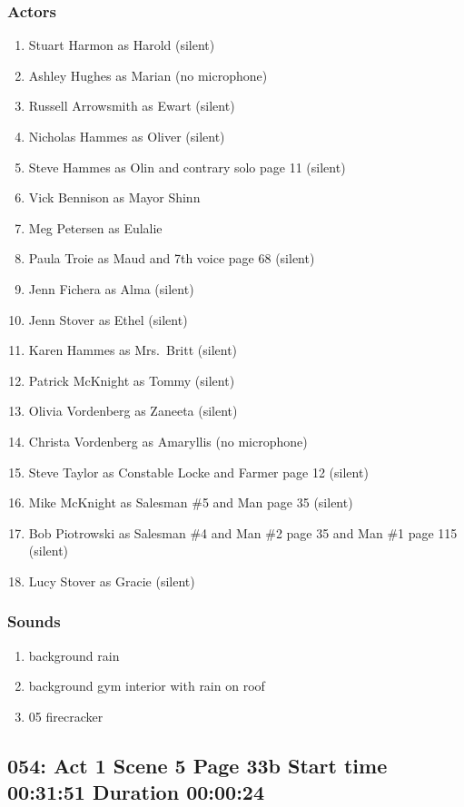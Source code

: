 \subsubsection{Actors}
\begin{enumerate}
\item Stuart Harmon as Harold (silent)
\item Ashley Hughes as Marian (no microphone)
\item Russell Arrowsmith as Ewart (silent)
\item Nicholas Hammes as Oliver (silent)
\item Steve Hammes as Olin and contrary solo page 11 (silent)
\item Vick Bennison as Mayor Shinn
\item Meg Petersen as Eulalie
\item Paula Troie as Maud and 7th voice page 68 (silent)
\item Jenn Fichera as Alma (silent)
\item Jenn Stover as Ethel (silent)
\item Karen Hammes as Mrs.~Britt (silent)
\item Patrick McKnight as Tommy (silent)
\item Olivia Vordenberg as Zaneeta (silent)
\item Christa Vordenberg as Amaryllis (no microphone)
\item Steve Taylor as Constable Locke and Farmer page 12 (silent)
\item Mike McKnight as Salesman \#5 and Man page 35 (silent)
\item Bob Piotrowski as Salesman \#4 and Man \#2 page 35 and Man \#1 page 115 (silent)
\item Lucy Stover as Gracie (silent)
\end{enumerate}

\subsubsection{Sounds}
\begin{enumerate}
\item background rain
\item background gym interior with rain on roof
\item 05 firecracker
\end{enumerate}
\subsection{054: Act 1 Scene 5 Page 33b Start time 00:31:51 Duration 00:00:24}

